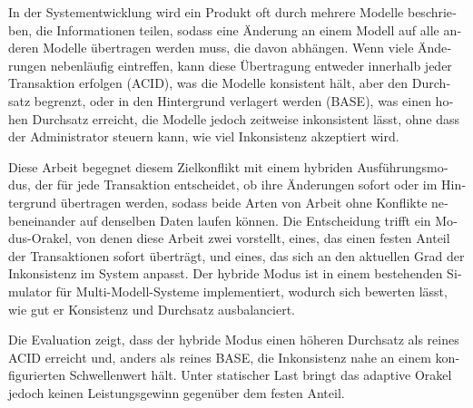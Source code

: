 \begin{otherlanguage}{ngerman}
  In der Systementwicklung wird ein Produkt oft durch mehrere Modelle
  beschrieben, die Informationen teilen, sodass eine Änderung an einem Modell
  auf alle anderen Modelle übertragen werden muss, die davon abhängen. Wenn
  viele Änderungen nebenläufig eintreffen, kann diese Übertragung entweder
  innerhalb jeder Transaktion erfolgen (ACID), was die Modelle konsistent hält,
  aber den Durchsatz begrenzt, oder in den Hintergrund verlagert werden (BASE),
  was einen hohen Durchsatz erreicht, die Modelle jedoch zeitweise inkonsistent
  lässt, ohne dass der Administrator steuern kann, wie viel Inkonsistenz
  akzeptiert wird.

  Diese Arbeit begegnet diesem Zielkonflikt mit einem hybriden
  Ausführungsmodus, der für jede Transaktion entscheidet, ob ihre Änderungen
  sofort oder im Hintergrund übertragen werden, sodass beide Arten von Arbeit
  ohne Konflikte nebeneinander auf denselben Daten laufen können. Die
  Entscheidung trifft ein Modus-Orakel, von denen diese Arbeit zwei vorstellt,
  eines, das einen festen Anteil der Transaktionen sofort überträgt, und eines,
  das sich an den aktuellen Grad der Inkonsistenz im System anpasst. Der hybride
  Modus ist in einem bestehenden Simulator für Multi-Modell-Systeme
  implementiert, wodurch sich bewerten lässt, wie gut er Konsistenz und
  Durchsatz ausbalanciert.

  Die Evaluation zeigt, dass der hybride Modus einen
  höheren Durchsatz als reines ACID erreicht und, anders als reines BASE, die
  Inkonsistenz nahe an einem konfigurierten Schwellenwert hält. Unter statischer
  Last bringt das adaptive Orakel jedoch keinen Leistungsgewinn gegenüber dem
  festen Anteil.
\end{otherlanguage}

\makeatletter
{}
{\renewcommand{\abstractname}{Abstract}}
{\renewcommand{\abstractname}{Kurzfassung}}
\makeatother
